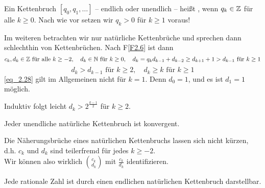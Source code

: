\begin{defn}
	Ein Kettenbruch $[q_0,q_1,\dots]$ -- endlich oder unendlich -- heißt , wenn $q_k \in \mathbb{Z}$ für alle $k \geq 0$. Nach wie vor setzen wir $q_k > 0$ für $k \geq 1$ voraus!
\end{defn}

Im weiteren betrachten wir nur natürliche Kettenbrüche und sprechen dann schlechthin von Kettenbrüchen. Nach F\ref{F2.6} ist dann
\[ c_k, d_k \in \mathbb{Z} \text{ für alle } k \geq -2, \quad d_k \in \mathbb{N} \text{ für } k \geq 0, \quad d_k = q_kd_{k-1} + d_{k-2} \geq d_{k+1} + 1 > d_{k-1} \text{ für } k \geq 1 \]
\begin{equation}
	d_k > d_{k-1} \text{ für } k \geq 2, \quad d_k \geq k \text{ für } k \geq 1 \label{eq_2.28}
\end{equation} 
\eqref{eq_2.28} gilt im Allgemeinen nicht für $k = 1$. Denn $d_0 = 1$, und es ist $d_1 = 1$ möglich.

	Induktiv folgt leicht $d_k > 2^{\frac{k-1}{2}}$ für $k \geq 2$.
	
\begin{falko} \label{F2.12}
	Jeder unendliche natürliche Kettenbruch ist konvergent.
\end{falko}

\begin{falko} \label{F2.13}
	Die Näherungsbrüche eines natürlichen Kettenbruchs lassen sich nicht kürzen, d.h. $c_k$ und $d_k$ sind teilerfremd für jedes $k \geq -2$. \\
	Wir können also wirklich $\binom{c_k}{d_k}$ mit $\frac{c_k}{d_k}$ identifizieren.
\end{falko}

\begin{falko} \label{F2.14}
	Jede rationale Zahl ist durch einen endlichen natürlichen Kettenbruch darstellbar.
\end{falko}

\newpage